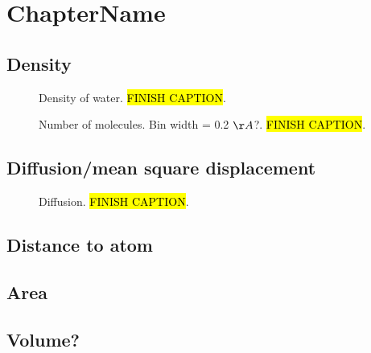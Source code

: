 \chapter{ChapterName}
\section{Density}
\begin{figure}[htpb]%
    \centering%
    \caption{%
        Density of water. \hl{FINISH CAPTION}. %
    }%
\end{figure}%
\begin{figure}[htpb]%
    \centering%
    \caption{%
        Number of molecules. Bin width = 0.2 $\AA$?. \hl{FINISH CAPTION}. %
    }%
\end{figure}%

\section{Diffusion/mean square displacement}
\begin{figure}[htpb]%
    \centering%
    \caption{%
        Diffusion. \hl{FINISH CAPTION}. %
    }%
\end{figure}%

    \section{Distance to atom}
    \section{Area}
    \section{Volume?}
